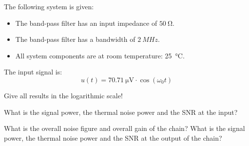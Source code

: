 \begin{question}[subtitle={Noise}]
	The following system is given:
	\begin{figure}[H]
		\centering
		\begin{adjustbox}{scale=0.7}
		\end{adjustbox}
	\end{figure}
	\begin{itemize}
		\item The band-pass filter has an input impedance of $\SI{50}{\ohm}$.
		\item The band-pass filter has a bandwidth of $\SI{2}{MHz}$.
		\item All system components are at room temperature: \SI{25}{\degreeCelsius}.
	\end{itemize}
	The input signal is:
	\begin{equation*}
		u(t) = \SI{70.71}{\micro\volt} \cdot \cos\left(\omega_0 t\right)
	\end{equation*}
	
	Give all results in the logarithmic scale!
	\begin{tasks}
		\task
		What is the signal power, the thermal noise power and the SNR at the input?
		
		\task
		What is the overall noise figure and overall gain of the chain? What is the signal power, the thermal noise power and the SNR at the output of the chain?
		

\end{tasks}
\end{question}
